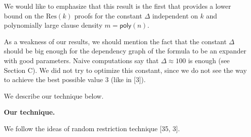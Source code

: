 \documentclass[10pt,a4paper]{article}
\begin{document}
We would like to emphasize that this result is the first that provides a lower bound on the $\mathrm{Res}(k)$
proofs for the constant $\Delta$ independent on $k$ and polynomially large clause density $m={\mathsf{poly}}(n)$.\par




As a weakness of our results, we should mention the fact that the constant $\Delta$ should be big enough
for the dependency graph of the formula to be an expander with good parameters. Naive computations say
that $\Delta\approx 100$ is enough (see Section C). We did not try to optimize
this constant, since we do not see the way to achieve the best possible value $3$ (like in
[3]).\par




We describe our technique below.\par




\par\medskip\noindent\textbf{Our technique.}\par




We follow the ideas of random restriction technique
[35, 3].\par
\end{document}
